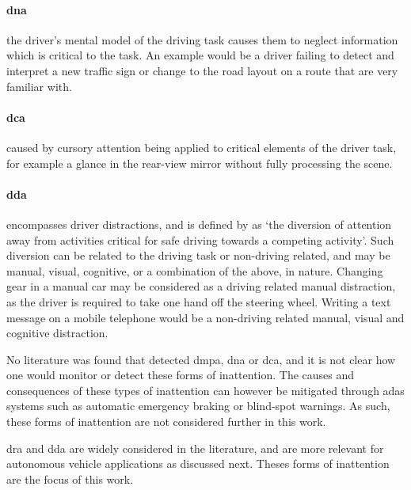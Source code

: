 \documentclass[11pt, parskip=half*,twoside=false]{scrbook}
\begin{document}
\paragraph{\gls{dna}} the driver's mental model of the driving task causes them to neglect information which is critical to the task. An example would be a driver failing to detect and interpret a new traffic sign or change to the road layout on a route that are very familiar with. 

\paragraph{\gls{dca}} caused by cursory attention being applied to critical elements of the driver task, for example a glance in the rear-view mirror without fully processing the scene. 

\paragraph{\gls{dda}} encompasses driver distractions, and is defined by \citet{reganDriverDistractionDriver2011} as `the diversion of attention away from activities critical for safe driving towards a competing activity'. Such diversion can be related to the driving task or non-driving related, and may be manual, visual, cognitive, or a combination of the above, in nature. Changing gear in a manual car may be considered as a driving related manual distraction, as the driver is required to take one hand off the steering wheel. Writing a text message on a mobile telephone would be a non-driving related manual, visual and cognitive distraction. 

No literature was found that detected \gls{dmpa}, \gls{dna} or \gls{dca}, and it is not clear how one would monitor or detect these forms of inattention. The causes and consequences of these types of inattention can however be mitigated through \gls{adas} systems such as automatic emergency braking or blind-spot warnings. As such, these forms of inattention are not considered further in this work.

\gls{dra} and \gls{dda} are widely considered in the literature, and are more relevant for autonomous vehicle applications as discussed next. Theses forms of inattention are the focus of this work.
\end{document}
